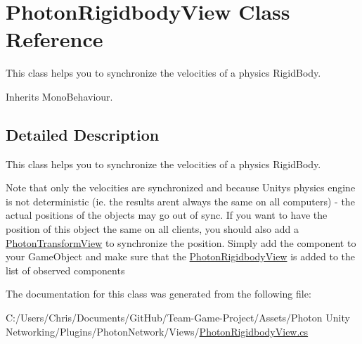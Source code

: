 \hypertarget{class_photon_rigidbody_view}{}\section{Photon\+Rigidbody\+View Class Reference}
\label{class_photon_rigidbody_view}


This class helps you to synchronize the velocities of a physics Rigid\+Body.  




Inherits Mono\+Behaviour.



\subsection{Detailed Description}
This class helps you to synchronize the velocities of a physics Rigid\+Body. 

Note that only the velocities are synchronized and because Unitys physics engine is not deterministic (ie. the results aren\textquotesingle{}t always the same on all computers) -\/ the actual positions of the objects may go out of sync. If you want to have the position of this object the same on all clients, you should also add a \hyperlink{class_photon_transform_view}{Photon\+Transform\+View} to synchronize the position. Simply add the component to your Game\+Object and make sure that the \hyperlink{class_photon_rigidbody_view}{Photon\+Rigidbody\+View} is added to the list of observed components 

The documentation for this class was generated from the following file\+:\begin{DoxyCompactItemize}
\item 
C\+:/\+Users/\+Chris/\+Documents/\+Git\+Hub/\+Team-\/\+Game-\/\+Project/\+Assets/\+Photon Unity Networking/\+Plugins/\+Photon\+Network/\+Views/\hyperlink{_photon_rigidbody_view_8cs}{Photon\+Rigidbody\+View.\+cs}\end{DoxyCompactItemize}
